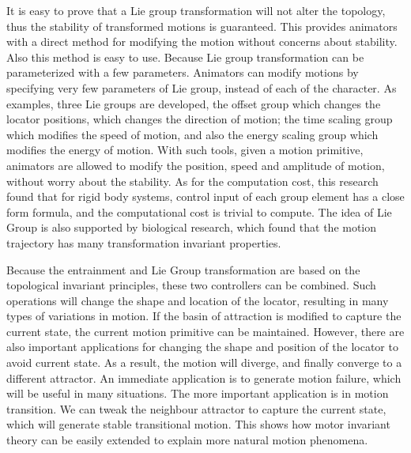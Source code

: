 It is easy to prove that a Lie group transformation will not alter the topology, thus the stability of transformed motions is guaranteed. 
This provides animators with a direct method for modifying the motion without concerns about stability.  
Also this method is easy to use. 
Because Lie group transformation can be parameterized with a few parameters. 
Animators can modify motions by specifying very few parameters of Lie group, instead of each \dof of the character. 
As examples, three Lie groups are developed, the offset group which  changes the locator positions, which changes the direction of motion; the time scaling group which modifies the speed of motion, and also the energy scaling group which modifies the energy of motion. With such tools, given a motion primitive, animators are allowed to modify the position, speed and amplitude of motion, without worry about the stability. 
As for the computation cost, this research found that for rigid body systems, control input of each group element has a close form formula, and the computational cost is trivial to compute. 
The idea of Lie Group is also supported by biological research, which found that the motion trajectory has many transformation invariant properties.


Because the {\cpg} entrainment and Lie Group transformation are based on the topological invariant principles, these two controllers can be combined.
Such operations will change the shape and location of the locator, resulting in many types of variations in motion. 
If the basin of attraction is modified to capture the current state, the current motion primitive can be maintained. 
However, there are also important applications for changing the shape and position of the locator to avoid current state. 
As a result, the motion will diverge, and finally converge to a different attractor. 
An immediate application is to generate motion failure, which will be useful in many situations. 
The more important application is in motion transition. 
We can tweak the neighbour attractor to capture the current state, which will generate stable transitional motion. 
This shows how motor invariant theory can be easily extended to explain more natural motion phenomena.

